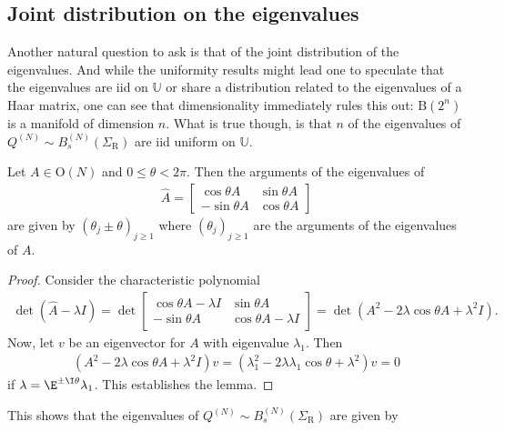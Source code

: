 \subsection{Joint distribution on the eigenvalues}

Another natural question to ask is that of the joint distribution of the eigenvalues.  And while the uniformity results might lead one to speculate that the eigenvalues are iid on $\mathbb U$ or share a distribution related to the eigenvalues of a Haar matrix, one can see that dimensionality immediately rules this out: $\mathrm B(2^{n})$ is a manifold of dimension $n$.  What is true though, is that $n$ of the eigenvalues of $Q^{(N)} \sim B_s^{(N)}(\Sigma_{\mathrm{R}})$ are iid uniform on $\mathbb U$.

\begin{lemma}
Let $A \in \mathrm O(N)$ and $0 \leq \theta < 2 \pi$.  Then the arguments of the eigenvalues of
\begin{align}
\hat A = \begin{bmatrix} \cos \theta A & \sin \theta A \\ - \sin \theta A & \cos \theta A \end{bmatrix}
\end{align}
are given by $(\theta_j \pm \theta)_{j \geq 1}$ where $(\theta_j)_{j \geq 1}$ are the arguments of the eigenvalues of $A$.
\end{lemma}

\begin{proof}
Consider the characteristic polynomial
\begin{align}
\det (\hat A - \lambda I) = \det \begin{bmatrix} \cos \theta A - \lambda I & \sin \theta A \\ - \sin \theta A & \cos \theta A - \lambda I\end{bmatrix} = \det ( A^2    - 2 \lambda \cos \theta A + \lambda^2 I).
\end{align}
Now, let $v$ be an eigenvector for $A$ with eigenvalue $\lambda_1$.  Then
\begin{align}
( A^2 - 2 \lambda \cos \theta A + \lambda^2 I)v = (\lambda_1^2  - 2 \lambda \lambda_1 \cos \theta  + \lambda^2) v = 0
\end{align}
if $\lambda = \E^{ \pm \I \theta } \lambda_1$. This establishes the lemma.
\end{proof}

This shows that the eigenvalues of $Q^{(N)} \sim B_s^{(N)}(\Sigma_{\mathrm{R}})$ are given by

